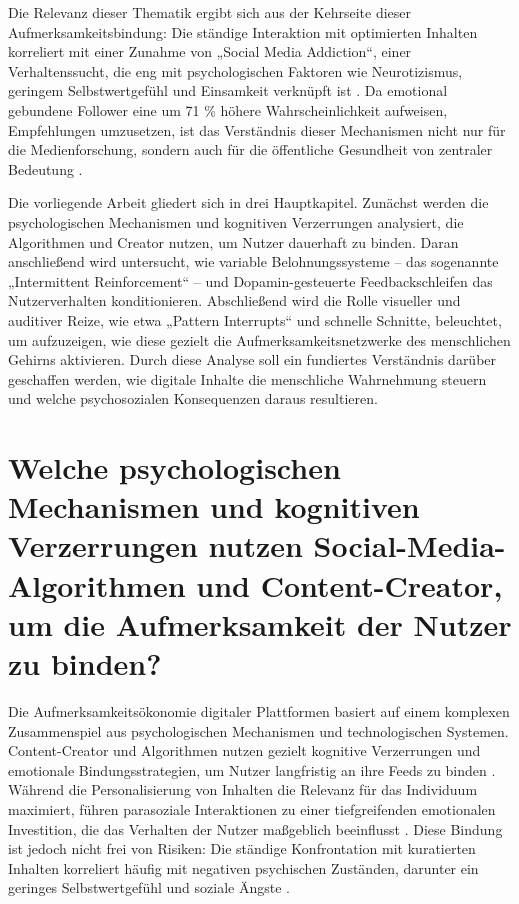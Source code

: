 \documentclass[11pt,a4paper]{article}
\begin{document}
Die Relevanz dieser Thematik ergibt sich aus der Kehrseite dieser Aufmerksamkeitsbindung: Die ständige Interaktion mit optimierten Inhalten korreliert mit einer Zunahme von „Social Media Addiction“, einer Verhaltenssucht, die eng mit psychologischen Faktoren wie Neurotizismus, geringem Selbstwertgefühl und Einsamkeit verknüpft ist \autocite{doaj_10febcbb5e60420699a1d4570a075832,openalex_W2924664363}. Da emotional gebundene Follower eine um 71 \% höhere Wahrscheinlichkeit aufweisen, Empfehlungen umzusetzen, ist das Verständnis dieser Mechanismen nicht nur für die Medienforschung, sondern auch für die öffentliche Gesundheit von zentraler Bedeutung \autocite{grey_grey_5d5c282590c448fc8776b04f78a08de5}.

Die vorliegende Arbeit gliedert sich in drei Hauptkapitel. Zunächst werden die psychologischen Mechanismen und kognitiven Verzerrungen analysiert, die Algorithmen und Creator nutzen, um Nutzer dauerhaft zu binden. Daran anschließend wird untersucht, wie variable Belohnungssysteme – das sogenannte „Intermittent Reinforcement“ – und Dopamin-gesteuerte Feedbackschleifen das Nutzerverhalten konditionieren. Abschließend wird die Rolle visueller und auditiver Reize, wie etwa „Pattern Interrupts“ und schnelle Schnitte, beleuchtet, um aufzuzeigen, wie diese gezielt die Aufmerksamkeitsnetzwerke des menschlichen Gehirns aktivieren. Durch diese Analyse soll ein fundiertes Verständnis darüber geschaffen werden, wie digitale Inhalte die menschliche Wahrnehmung steuern und welche psychosozialen Konsequenzen daraus resultieren.

\section{Welche psychologischen Mechanismen und kognitiven Verzerrungen nutzen Social-Media-Algorithmen und Content-Creator, um die Aufmerksamkeit der Nutzer zu binden?}

Die Aufmerksamkeitsökonomie digitaler Plattformen basiert auf einem komplexen Zusammenspiel aus psychologischen Mechanismen und technologischen Systemen. Content-Creator und Algorithmen nutzen gezielt kognitive Verzerrungen und emotionale Bindungsstrategien, um Nutzer langfristig an ihre Feeds zu binden \autocite{grey_grey_5d5c282590c448fc8776b04f78a08de5,crossref_10_22215_etd_2019_13484}. Während die Personalisierung von Inhalten die Relevanz für das Individuum maximiert, führen parasoziale Interaktionen zu einer tiefgreifenden emotionalen Investition, die das Verhalten der Nutzer maßgeblich beeinflusst \autocite{grey_grey_5d5c282590c448fc8776b04f78a08de5,crossref_10_22215_etd_2019_13484}. Diese Bindung ist jedoch nicht frei von Risiken: Die ständige Konfrontation mit kuratierten Inhalten korreliert häufig mit negativen psychischen Zuständen, darunter ein geringes Selbstwertgefühl und soziale Ängste \autocite{doaj_10febcbb5e60420699a1d4570a075832,openalex_W2924664363}.
\end{document}
